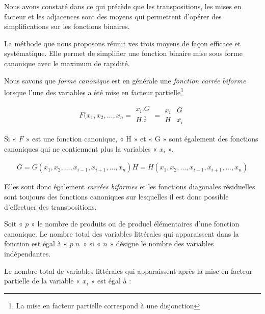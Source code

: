 Nous avons constaté dans ce qui précède que les transpositions, les mises en facteur et les adjacences sont des moyens qui permettent d'opérer des simplifications sur les fonctions binaires. 

La méthode que nous proposons réunit xes trois moyens de façon efficace et systématique. Elle permet de simplifier une fonction binaire mise sous forme canonique avec le maximum de rapidité. 

Nous savons que \textsl{forme canonique} est en générale une \textsl{fonction carrée biforme}  lorsque l'une des variables a été mise en facteur partielle\footnote{La mise en facteur partielle correspond à une disjonction} 

 \medskip
 
  \[ F (x_1, x_2,\ldots , x_n = 
  \begin{array}{|c|}  x_i . G \\ H . \overline{i} \\ \end{array}
     = \begin{array}{|c|c|} x_i & G \\ H & \overline{x_i} \end{array} 
  \]
  
  \medskip  
  
Si « $F$ » est une fonction canonique, « H » et « G » sont également des fonctions canoniques qui ne  contiennent plus la variables « $x_i$ ». 

\medskip
    
    \[
    \begin{array}{|c} 
    		G = G (x_1, x_2, \ldots, x_{i-1}, x_{i+1}, \ldots, x_n) 
    		H = H (x_1, x_2, \ldots, x_{i-1}, x_{i+1}, \ldots, x_n) 
    \end{array}
    \]
    
    \medskip     
    
Elles sont donc également \textsl{carrées biformes} et les fonctions diagonales résiduelles sont toujours des fonctions canoniques sur lesquelles il est donc possible d'effectuer des transpositions.    

Soit « $p$ » le nombre de produits ou de produel élémentaires d'une fonction canonique. Le nombre total des variables littérales qui apparaissent dans la fonction est égal à « $p . n$~» si « $n$ » désigne le nombre des variables indépendantes. 

Le nombre total de variables littérales qui apparaissent après la mise en facteur partielle de la variable « $x_i$ » est égal à : 

